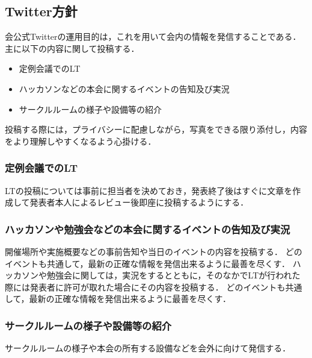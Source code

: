 \subsection*{Twitter方針}


会公式Twitterの運用目的は，これを用いて会内の情報を発信することである．主に以下の内容に関して投稿する．

\begin{itemize}
\item 定例会議でのLT
\item ハッカソンなどの本会に関するイベントの告知及び実況
\item サークルルームの様子や設備等の紹介
\end{itemize}

投稿する際には，プライバシーに配慮しながら，写真をできる限り添付し，内容をより理解しやすくなるよう心掛ける．

\subsubsection*{定例会議でのLT}
LTの投稿については事前に担当者を決めておき，発表終了後はすぐに文章を作成して発表者本人によるレビュー後即座に投稿するようにする．

\subsubsection*{ハッカソンや勉強会などの本会に関するイベントの告知及び実況}
開催場所や実施概要などの事前告知や当日のイベントの内容を投稿する．
どのイベントも共通して，最新の正確な情報を発信出来るように最善を尽くす．
ハッカソンや勉強会に関しては，実況をするとともに，そのなかでLTが行われた際には発表者に許可が取れた場合にその内容を投稿する．
どのイベントも共通して，最新の正確な情報を発信出来るように最善を尽くす．

\subsubsection*{サークルルームの様子や設備等の紹介}
サークルルームの様子や本会の所有する設備などを会外に向けて発信する．
